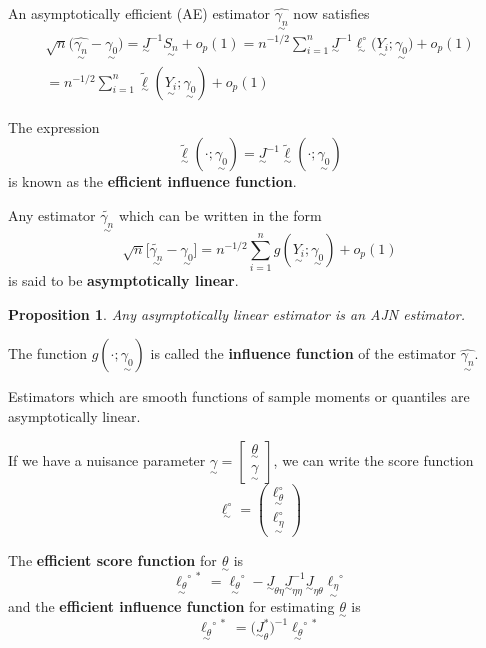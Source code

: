 \documentclass[twoside]{article}
\newtheorem{proposition}[theorem]{Proposition}
\newcommand{\utilde}{\underset{\sim}}
\begin{document}
An asymptotically efficient (AE) estimator $\hat{\utilde{\gamma_{n}}}$ now satisfies 
\begin{align}
\sqrt{n}\bigg(\hat{\utilde{\gamma_{n}}} - \utilde{\gamma_{0}} \bigg) = \utilde{J}^{-1}\utilde{S_{n}} + o_p(1) = n^{-1/2}\sum_{i=1}^{n}\utilde{J}^{-1}\utilde{\ell^{\circ}}\bigg(\utilde{Y_{i}}; \utilde{\gamma_{0}} \bigg) + o_p(1) \\= n^{-1/2}\sum_{i=1}^{n}\tilde{\utilde{\ell}}(\utilde{Y_{i}}; \utilde{\gamma_{0}}) + o_p(1)
\end{align}

The expression 
\begin{equation}
\tilde{\utilde{\ell}}(\cdot; \utilde{\gamma_{0}}) = \utilde{J}^{-1}\tilde{\utilde{\ell}}(\cdot ; \utilde{\gamma_{0}})
\end{equation}
is known as the \textbf{efficient influence function}.


Any estimator $\tilde{\utilde{\gamma_{n}}}$ which can be written in the form 
\begin{equation}
\sqrt{n}\bigg[\tilde{\utilde{\gamma_{n}}} - \utilde{\gamma_{0}} \bigg] = n^{-1/2}\sum_{i=1}^{n}g(\utilde{Y_{i}}; \utilde{\gamma_{0}}) + o_p(1)
\end{equation}
is said to be \textbf{asymptotically linear}. 

\begin{proposition} Any asymptotically linear estimator is an AJN estimator.
\end{proposition}

The function $g(\cdot ; \utilde{\gamma_{0}})$ is called the \textbf{influence function} of the estimator $\hat{\utilde{\gamma_{n}}}$.

Estimators which are smooth functions of sample moments or quantiles are asymptotically linear.


If we have a nuisance parameter $\utilde{\gamma} = \begin{bmatrix}\utilde{\theta}\\ \utilde{\gamma} \end{bmatrix}$, we can write the score function 
\begin{equation}
\utilde{\ell^{\circ}} = 
\begin{pmatrix}
\utilde{\ell_{\theta}^{\circ}}\\
\utilde{\ell_{\eta}^{\circ}}
\end{pmatrix}
\end{equation}

The \textbf{efficient score function} for $\utilde{\theta}$ is 
\begin{equation}
\utilde{\ell_{\theta}}^{\circ \; *} = \utilde{\ell_{\theta}}^{\circ} - \utilde{J}_{\theta \eta}\utilde{J}_{\eta \eta}^{-1}\utilde{J}_{\eta \theta}\utilde{\ell_{\eta}}^{\circ}
\end{equation}
and the \textbf{efficient influence function} for estimating $\utilde{\theta}$ is 
\begin{equation}
\utilde{\ell_{\theta}}^{\circ \; *} = \bigg(\utilde{J}_{\theta}^{*} \bigg)^{-1}\utilde{\ell_{\theta}}^{\circ \; *}
\end{equation}
\end{document}

